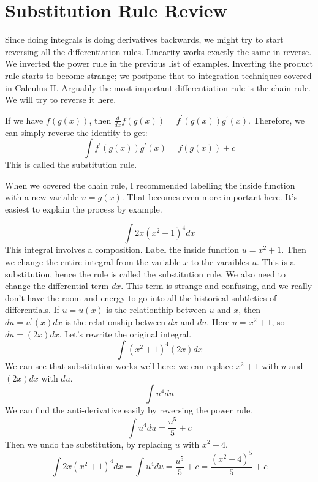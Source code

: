 \documentclass[fleqn]{report}
\begin{document}
\section{Substitution Rule Review}
\label{substitution-rule}

Since doing integrals is doing derivatives backwards, we might
try to start reversing all the differentiation rules.
Linearity works exactly the same in reverse.
We inverted the power rule in the previous list of
examples. Inverting the product rule starts to become
strange; we postpone that to integration techniques covered in
Calculus II. Arguably the most important differentiation rule is
the chain rule. We will try to reverse it here.

\begin{defn}
If we have $f(g(x))$, then $\frac{d}{dx} f(g(x)) =
f^\prime(g(x)) g^\prime(x)$. Therefore, we can simply reverse
the identity to get: 
\begin{equation*}
\int f^\prime(g(x)) g^\prime(x) = f(g(x)) + c
\end{equation*}
This is called the substitution rule.
\end{defn}

When we covered the chain rule, I recommended labelling the inside
function with a new variable $u = g(x)$. That becomes even
more important here. It's easiest to explain the process by
example.

\begin{example} 
\begin{equation*}
\int 2x (x^2+1)^4 dx 
\end{equation*}
This integral involves a composition. 
Label the inside function $u = x^2 + 1$. Then we
change the entire integral from the variable $x$
to the varaibles $u$. This is a substitution, hence the rule
is called the substitution rule.
We also need to change the differential term $dx$. This term
is strange and confusing, and we really don't have the room
and energy to go into all the historical subtleties of
differentials. If $u =
u(x)$ is the relationthip between $u$ and $x$, then $du =
u^\prime(x) dx$ is the relationship between $dx$ and $du$.
Here $u = x^2 +1$, so $du = (2x) dx$. Let's
rewrite the original integral.
\begin{equation*}
\int (x^2+1)^4 (2x)dx 
\end{equation*}
We can see that substitution works well here: we can
replace $x^2 +1$ with $u$ and $(2x) dx$ with $du$. 
\begin{equation*}
\int u^4 du 
\end{equation*}
We can find the anti-derivative easily by reversing the power
rule.
\begin{equation*}
\int u^4 du = \frac{u^5}{5} + c
\end{equation*}
Then we undo the substitution, by replacing $u$ with $x^2+4$.
\begin{equation*}
\int 2x (x^2+1)^4 dx = \int u^4 du = \frac{u^5}{5} + c =
\frac{(x^2+4)^5}{5} + c
\end{equation*}
\end{example}
\end{document}
